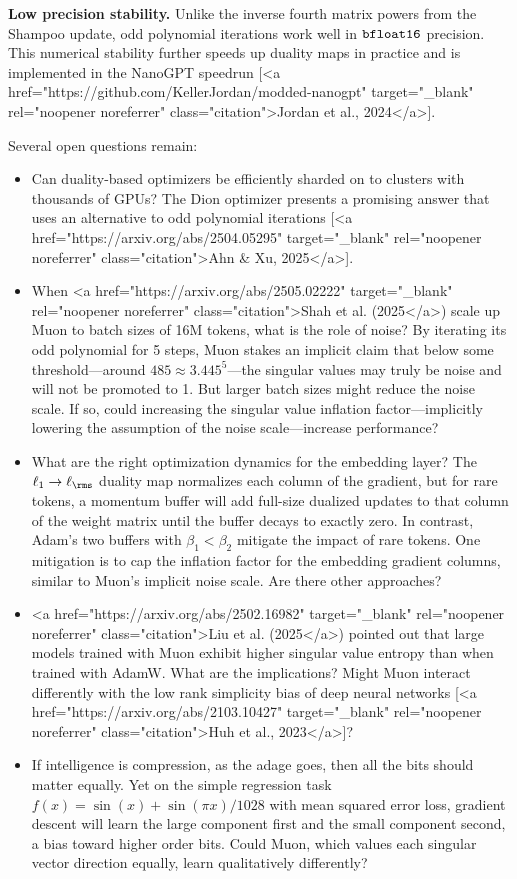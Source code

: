 \textbf{Low precision stability.} Unlike the inverse fourth matrix powers from the Shampoo update, odd polynomial iterations work well in $\verb|bfloat16|$ precision. This numerical stability further speeds up duality maps in practice and is implemented in the NanoGPT speedrun [<a href="https://github.com/KellerJordan/modded-nanogpt" target="_blank" rel="noopener noreferrer" class="citation">Jordan et al., 2024</a>].

\vspace{1em}

Several open questions remain:
\begin{itemize}
    \item Can duality-based optimizers be efficiently sharded on to clusters with thousands of GPUs? The Dion optimizer presents a promising answer that uses an alternative to odd polynomial iterations [<a href="https://arxiv.org/abs/2504.05295" target="_blank" rel="noopener noreferrer" class="citation">Ahn & Xu, 2025</a>].
    \item When <a href="https://arxiv.org/abs/2505.02222" target="_blank" rel="noopener noreferrer" class="citation">Shah et al. (2025</a>) scale up Muon to batch sizes of 16M tokens, what is the role of noise? By iterating its odd polynomial for 5 steps, Muon stakes an implicit claim that below some threshold---around $485 \approx 3.445^5$---the singular values may truly be noise and will not be promoted to 1. But larger batch sizes might reduce the noise scale. If so, could increasing the singular value inflation factor---implicitly lowering the assumption of the noise scale---increase performance?
    \item What are the right optimization dynamics for the embedding layer? The $\ell_1 \to \ell_\rms$ duality map normalizes each column of the gradient, but for rare tokens, a momentum buffer will add full-size dualized updates to that column of the weight matrix until the buffer decays to exactly zero. In contrast, Adam's two buffers with $\beta_1 < \beta_2$ mitigate the impact of rare tokens. One mitigation is to cap the inflation factor for the embedding gradient columns, similar to Muon's implicit noise scale. Are there other approaches?
    \item <a href="https://arxiv.org/abs/2502.16982" target="_blank" rel="noopener noreferrer" class="citation">Liu et al. (2025</a>) pointed out that large models trained with Muon exhibit higher singular value entropy than when trained with AdamW. What are the implications? Might Muon interact differently with 
    the low rank simplicity bias of deep neural networks [<a href="https://arxiv.org/abs/2103.10427" target="_blank" rel="noopener noreferrer" class="citation">Huh et al., 2023</a>]?
    \item If intelligence is compression, as the adage goes, then all the bits should matter equally. Yet on the simple regression task $f(x) = \sin(x) + \sin(\pi x)/1028$ with mean squared error loss, gradient descent will learn the large component first and the small component second, a bias toward higher order bits. Could Muon, which values each singular vector direction equally, learn qualitatively differently?
\end{itemize}


